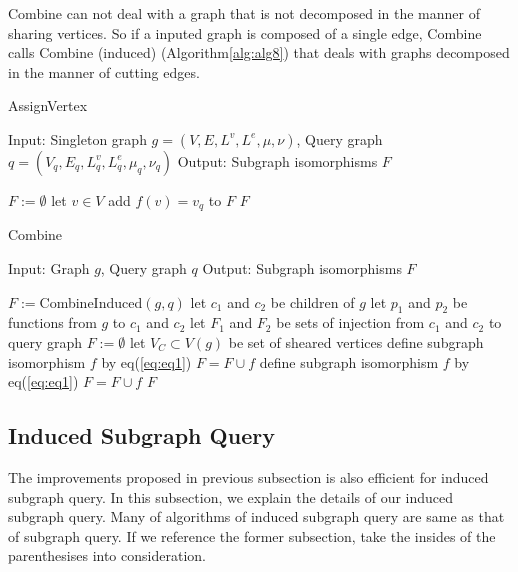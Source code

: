 Combine can not deal with a graph that is not decomposed in the manner of sharing vertices.
So if a inputed graph is composed of a single edge, Combine calls Combine (induced) (Algorithm\ref{alg:alg8})
that deals with graphs decomposed in the manner of cutting edges.

\begin{algorithm}
\caption{AssignVertex}
\label{alg:alg6}
\begin{algorithmic}
\STATE Input: Singleton graph $g=(V,E,L^v ,L^e ,\mu,\nu)$, Query graph $q=(V_q,E_q,L_q^v ,L_q^e ,\mu_q,\nu_q)$ 
\STATE Output: Subgraph isomorphisms $F$
\end{algorithmic}
\begin{algorithmic}[1]
\STATE $F := \emptyset$
\STATE let $v \in V$
		\STATE add $f(v) = v_q$ to $F$
	\ENDIF
\ENDFOR
\RETURN $F$
\end{algorithmic}
\end{algorithm}

\begin{algorithm}
\caption{Combine}
\label{alg:alg11}
\begin{algorithmic}
\STATE Input: Graph $g$, Query graph $q$
\STATE Output: Subgraph isomorphisms $F$
\end{algorithmic}
\begin{algorithmic}[1]
	\STATE $F := $CombineInduced$(g,q)$
\ELSE
	\STATE let $c_1$ and $c_2$ be children of $g$
	\STATE let $p_1$ and $p_2$ be functions from $g$ to $c_1$ and $c_2$
	\STATE let $F_1$ and $F_2$ be sets of injection from $c_1$ and $c_2$ to query graph
	\STATE $F := \emptyset$
		\STATE let $V_C \subset V(g)$ be set of sheared vertices
					\STATE define subgraph isomorphism $f$ by eq(\ref{eq:eq1})
					\STATE $F = F \cup f $
				\ENDIF
			\ENDIF
		\ENDFOR
	\ELSE
				\STATE define subgraph isomorphism $f$ by eq(\ref{eq:eq1})
				\STATE $F = F \cup f $
			\ENDIF
		\ENDFOR
	\ENDIF
\ENDIF
\RETURN $F$
\end{algorithmic}
\end{algorithm}

\subsection{Induced Subgraph Query}
The improvements proposed in previous subsection is also efficient for induced subgraph query.
In this subsection, we explain the details of our induced subgraph query.
Many of algorithms of induced subgraph query are same as that of subgraph query.
If we reference the former subsection, take the insides of the parenthesises into consideration.

